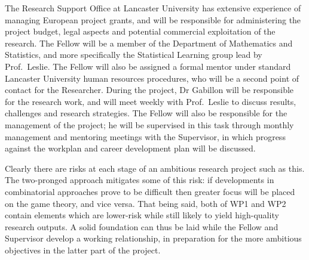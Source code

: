 \documentclass[a4paper,11pt]{article}
\begin{document}
The Research Support Office at Lancaster University has extensive experience of managing European project grants, and will be responsible for administering the project budget, legal aspects and potential commercial exploitation of the research.  The Fellow will be a member of the Department of Mathematics and Statistics, and more specifically the Statistical Learning group lead by Prof.\ Leslie.  The Fellow will also be assigned a formal mentor under standard Lancaster University human resources procedures, who will be a second point of contact for the Researcher.  During the project, Dr Gabillon will be responsible for the research work, and will meet weekly with Prof.\ Leslie to discuss results, challenges and research strategies.  The Fellow will also be responsible for the management of the project; he will be supervised in this task through monthly management and mentoring meetings with the Supervisor, in which progress against the workplan and career development plan will be discussed.

Clearly there are risks at each stage of an ambitious research project such as this. The two-pronged approach mitigates some of this risk: if developments in combinatorial approaches prove to be difficult then greater focus will be placed on the game theory, and vice versa.  That being said, both of WP1 and WP2 contain elements which are lower-risk while still likely to yield high-quality research outputs. A solid foundation can thus be laid while the Fellow and Supervisor develop a working relationship, in preparation for the more ambitious objectives in the latter part of the project.
\end{document}
